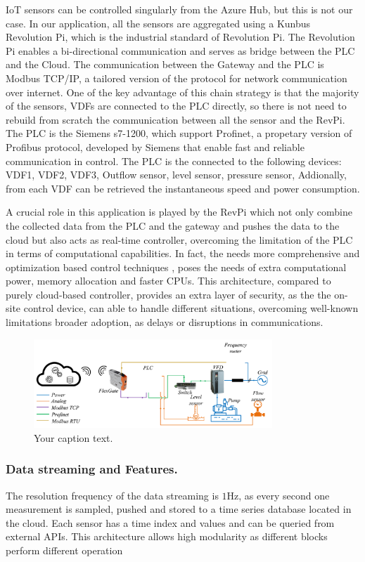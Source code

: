 IoT sensors can be controlled singularly from the Azure Hub, but this is not our case. In our application, all the sensors are 
aggregated using a Kunbus Revolution Pi, which is the industrial standard of Revolution Pi. 
The Revolution Pi enables a bi-directional communication and serves as bridge between the PLC and the Cloud. 
The communication between the Gateway and the PLC is Modbus TCP/IP, a tailored version of the protocol for network communication 
over internet. One of the key advantage of this chain strategy is that the majority of the sensors, VDFs are connected to the 
PLC directly, so there is not need to rebuild from scratch the communication between all the sensor and the RevPi. 
The PLC is the Siemens s7-1200, which support Profinet, a propetary version of Profibus protocol, developed by Siemens that enable fast and reliable communication in control. 
The PLC is the connected to the following devices: VDF1, VDF2, VDF3, Outflow sensor, level sensor, pressure sensor, 
Addionally, from each VDF can be retrieved the instantaneous speed and power consumption. 

A crucial role in this application is played by the RevPi which not only combine the collected data from the 
PLC and the gateway and pushes the data to the cloud but also acts as real-time controller, overcoming the limitation 
of the PLC in terms of computational capabilities. In fact, the needs more comprehensive and optimization based control techniques 
, poses the needs of extra computational power, memory allocation and faster CPUs.
This architecture, compared to purely cloud-based controller, provides an extra layer of security, as the the on-site control device, can able to handle different 
situations, overcoming well-known limitations broader adoption, as delays or disruptions in communications.


\begin{figure}[h]
    \centering
    \includegraphics[width=0.8\textwidth]{img/test.pdf}
    \caption{Your caption text.}
    \label{fig:your_label}
\end{figure}


\subsubsection{Data streaming and Features.}
The resolution frequency of the data streaming is $1\si{\hertz}$, as every second one measurement is sampled, pushed and stored to a time series database 
located in the cloud. Each sensor has a time index and values and can be queried from external APIs. 
This architecture allows high modularity as different blocks perform different operation




